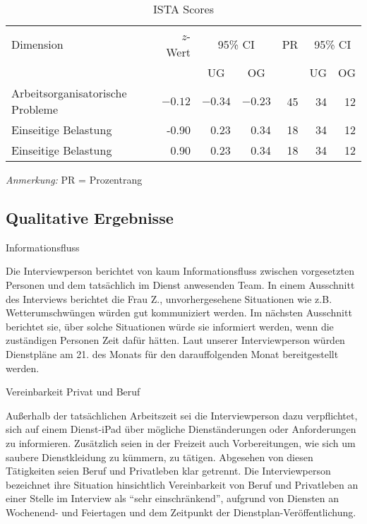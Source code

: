 \documentclass[12pt, a4paper]{article}
\begin{document}
\begin{table}[h]
    \centering
    \begin{threeparttable}
    \caption{ISTA Scores}
    \begin{tabular}{lrrrrrr}
        \toprule
        Dimension & {$z$-Wert} & \multicolumn{2}{c}{95\% CI}  & PR & \multicolumn{2}{c}{95\% CI} \\
        \cmidrule(lr){3-4} \cmidrule(lr){6-7}
         & & \multicolumn{1}{c}{UG}  & \multicolumn{1}{c}{OG} & & \multicolumn{1}{c}{UG} & \multicolumn{1}{c}{OG} \\
        \midrule
        Arbeitsorganisatorische Probleme & $-0.12$ & $-0.34$ & $-0.23$ & 45 & 34 & 12\\
        Einseitige Belastung & -0.90 & 0.23 & 0.34 & 18 & 34 & 12 \\
        Einseitige Belastung & 0.90 & 0.23 & 0.34 & 18 & 34 & 12 \\
        \bottomrule
    \end{tabular}
    \begin{tablenotes}[flushleft]
        \small
        \item \textit{Anmerkung:} PR = Prozentrang
    \end{tablenotes}
    \end{threeparttable}
\end{table}

\subsection{Qualitative Ergebnisse}

Informationsfluss

Die Interviewperson berichtet von kaum Informationsfluss zwischen vorgesetzten Personen und dem tatsächlich im Dienst anwesenden Team. 
In einem Ausschnitt des Interviews berichtet die Frau Z., unvorhergesehene Situationen wie z.B. Wetterumschwüngen würden gut kommuniziert werden.
Im nächsten Ausschnitt berichtet sie, über solche Situationen würde sie informiert werden, wenn die zuständigen Personen Zeit dafür hätten.
Laut unserer Interviewperson würden Dienstpläne am 21. des Monats für den darauffolgenden Monat bereitgestellt werden.

Vereinbarkeit Privat und Beruf

Außerhalb der tatsächlichen Arbeitszeit sei die Interviewperson dazu verpflichtet, sich auf einem Dienst-iPad über mögliche Dienständerungen
oder Anforderungen zu informieren. Zusätzlich seien in der Freizeit auch Vorbereitungen, wie sich um saubere Dienstkleidung zu kümmern, zu tätigen.
Abgesehen von diesen Tätigkeiten seien Beruf und Privatleben klar getrennt.
Die Interviewperson bezeichnet ihre Situation hinsichtlich Vereinbarkeit von Beruf 
und Privatleben an einer Stelle im Interview als “sehr einschränkend”, aufgrund von Diensten an Wochenend- und Feiertagen 
und dem Zeitpunkt der Dienstplan-Veröffentlichung.
\end{document}
